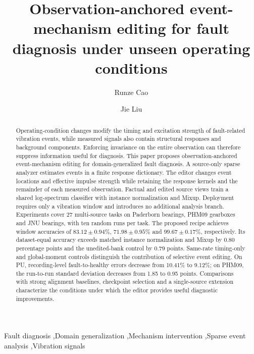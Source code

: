 \documentclass[a4paper,fleqn]{cas-sc}
\begin{document}
\let\WriteBookmarks\relax
{}
\title[mode=title]{Observation-anchored event-mechanism editing for fault diagnosis under unseen operating conditions}
\author[1]{Runze Cao}
\author[1]{Jie Liu}
\cormark[1]
\begin{abstract}
Operating-condition changes modify the timing and excitation strength of fault-related vibration events, while measured signals also contain structural responses and background components. Enforcing invariance on the entire observation can therefore suppress information useful for diagnosis. This paper proposes observation-anchored event-mechanism editing for domain-generalized fault diagnosis. A source-only sparse analyzer estimates events in a finite response dictionary. The editor changes event locations and effective impulse strength while retaining the response kernels and the remainder of each measured observation. Factual and edited source views train a shared log-spectrum classifier with instance normalization and Mixup. Deployment requires only a vibration window and introduces no additional analysis branch. Experiments cover 27 multi-source tasks on Paderborn bearings, PHM09 gearboxes and JNU bearings, with ten random runs per task. The proposed recipe achieves window accuracies of $83.12\pm0.94\%$, $71.98\pm0.95\%$ and $99.67\pm0.17\%$, respectively. Its dataset-equal accuracy exceeds matched instance normalization and Mixup by 0.80 percentage points and the unedited-bank control by 0.79 points. Same-rate timing-only and global-moment controls distinguish the contribution of selective event editing. On PU, recording-level fault-to-healthy errors decrease from 10.41\% to 9.12\%; on PHM09, the run-to-run standard deviation decreases from 1.85 to 0.95 points. Comparisons with strong alignment baselines, checkpoint selection and a single-source extension characterize the conditions under which the editor provides useful diagnostic improvements.
\end{abstract}
\begin{keywords}
Fault diagnosis \sep Domain generalization \sep Mechanism intervention \sep Sparse event analysis \sep Vibration signals
\end{keywords}
\maketitle
\end{document}
